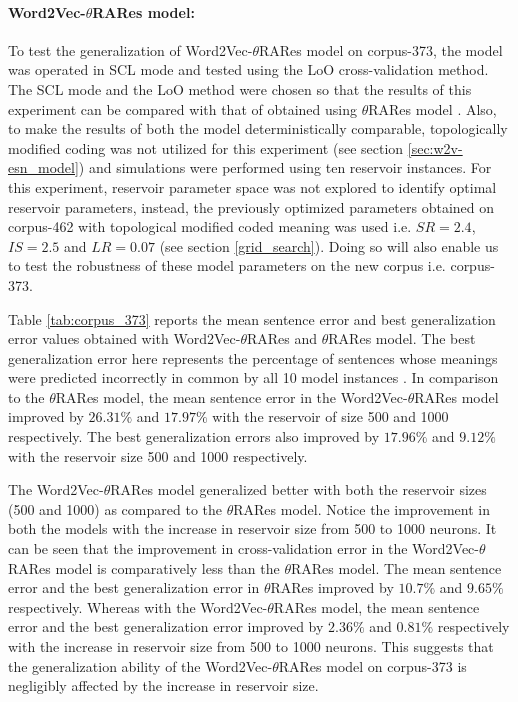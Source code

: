 \paragraph{Word2Vec-$\theta$RARes model:} To test the generalization of Word2Vec-$\theta$RARes model on corpus-373, the model was operated in SCL mode and tested using the LoO cross-validation method. The SCL mode and the LoO method were chosen so that the results of this experiment can be compared with that of obtained using $\theta$RARes model \cite{tra:xavier_hri}. Also, to make the results of both the model deterministically comparable, topologically modified coding was not utilized for this experiment (see section \ref{sec:w2v-esn_model}) and simulations were performed using ten reservoir instances. For this experiment, reservoir parameter space was not explored to identify optimal reservoir parameters, instead, the previously optimized parameters obtained on corpus-462 with topological modified coded meaning was used i.e. $SR = 2.4$, $IS = 2.5$ and $LR = 0.07$ (see section \ref{grid_search}). Doing so will also enable us to test the robustness of these model parameters on the new corpus i.e. corpus-373.

Table \ref{tab:corpus_373} reports the mean sentence error and best generalization error values obtained with Word2Vec-$\theta$RARes and $\theta$RARes model. The best generalization error here represents the percentage of sentences whose meanings were predicted incorrectly in common by all 10 model instances \cite{tra:xavier_hri}. In comparison to the $\theta$RARes model, the mean sentence error in the Word2Vec-$\theta$RARes model improved by $26.31\%$ and $17.97\%$  with the reservoir of size 500 and 1000 respectively. The best generalization errors also improved by $17.96 \%$ and $9.12 \%$ with the reservoir size 500 and 1000 respectively.

The Word2Vec-$\theta$RARes model generalized better with both the reservoir sizes (500 and 1000) as compared to the $\theta$RARes model. Notice the improvement in both the models with the increase in reservoir size from 500 to 1000 neurons. It can be seen that the improvement in cross-validation error in the Word2Vec-$\theta$RARes model is comparatively less than the $\theta$RARes model. The mean sentence error and the best generalization error in $\theta$RARes improved by $10.7 \%$ and $9.65 \%$ respectively. Whereas with the Word2Vec-$\theta$RARes model, the mean sentence error and the best generalization error improved by $2.36 \%$ and $0.81\%$ respectively with the increase in reservoir size from 500 to 1000 neurons. This suggests that the generalization ability of the Word2Vec-$\theta$RARes model on corpus-373 is negligibly affected by the increase in reservoir size.  

